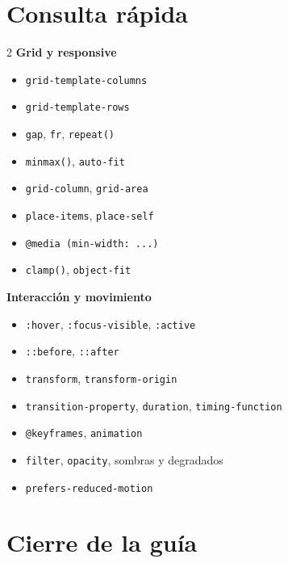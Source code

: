 \documentclass[11pt]{article}
\begin{document}
\section{Consulta rápida}

\begin{multicols}{2}
\textbf{Grid y responsive}
\begin{itemize}
    \item \texttt{grid-template-columns}
    \item \texttt{grid-template-rows}
    \item \texttt{gap}, \texttt{fr}, \texttt{repeat()}
    \item \texttt{minmax()}, \texttt{auto-fit}
    \item \texttt{grid-column}, \texttt{grid-area}
    \item \texttt{place-items}, \texttt{place-self}
    \item \texttt{@media (min-width: ...)}
    \item \texttt{clamp()}, \texttt{object-fit}
\end{itemize}

\columnbreak
\textbf{Interacción y movimiento}
\begin{itemize}
    \item \texttt{:hover}, \texttt{:focus-visible}, \texttt{:active}
    \item \texttt{::before}, \texttt{::after}
    \item \texttt{transform}, \texttt{transform-origin}
    \item \texttt{transition-property}, \texttt{duration}, \texttt{timing-function}
    \item \texttt{@keyframes}, \texttt{animation}
    \item \texttt{filter}, \texttt{opacity}, sombras y degradados
    \item \texttt{prefers-reduced-motion}
\end{itemize}
\end{multicols}


\section{Cierre de la guía}
\end{document}
